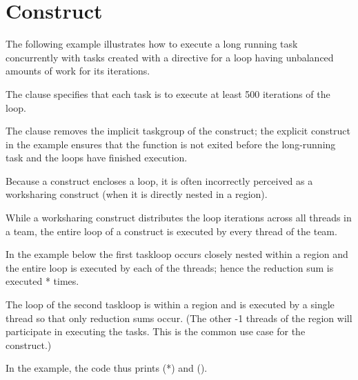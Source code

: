 \pagebreak
\section{ Construct}
\label{sec:taskloop}

The following example illustrates how to execute a long running task concurrently with tasks created
with a  directive for a loop having unbalanced amounts of work for its iterations.

The  clause specifies that each task is to execute at least 500 iterations of the loop. 

The  clause removes the implicit taskgroup of the  construct; the explicit  construct in the example ensures that the function is not exited before the long-running task and the loops have finished execution.




Because a  construct encloses a loop, it is often incorrectly 
perceived as a worksharing construct (when it is directly nested in 
a  region).

While a worksharing construct distributes the loop iterations across all threads in a team,
the entire loop of a  construct is executed by every thread of the team.

In the example below the first taskloop occurs closely nested within 
a  region and the entire loop is executed by each of the  threads; 
hence the reduction sum is executed * times.
 
The loop of the second taskloop is within a  region and is executed
by a single thread so that only  reduction sums occur.  (The other
-1 threads of the  region will participate in executing the 
tasks. This is the common use case for the  construct.)

In the example, the code thus prints  (*) and 
 ().


